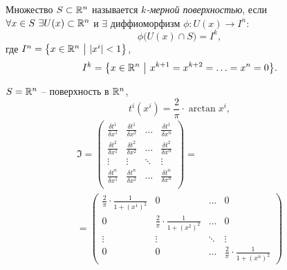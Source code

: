 

\begin{definition}
    Множество $ S \subset \mathbb{R}^n $ называется \emph{$ k $-мерной поверхностью}, если $ \forall x \in S \ \exists U(x)\subset\R^n $ и $ \exists $ диффиоморфизм $ \phi: U(x)\rightarrow I^n $:
    \[
        \phi\big(U(x)\cap S\big) = I^k,
    \] где $ I^n = \big\{x \in \mathbb{R}^n \ \big| \ |x^i| < 1 \big\} $,
    \[
        I^k = \big\{x \in \mathbb{R}^n \ \big| \ x^{k+1} = x^{k+2} = \ldots = x^n = 0\big\}.
    \]
\end{definition}

\begin{example}
    $S = \mathbb{R}^n$ -- поверхность в $\mathbb{R}^n$,
    \[
        t^i(x^i) = \frac{2}{\pi}\cdot \arctan x^i,
    \]
    \begin{multline*}
        \mathfrak{I} = \left(\begin{matrix}
                \frac{\delta t^1}{\delta x^1} & \frac{\delta t^1}{\delta x^2} & \ldots & \frac{\delta t^1}{\delta x^n} \\
                \frac{\delta t^2}{\delta x^1} & \frac{\delta t^2}{\delta x^2} & \ldots & \frac{\delta t^2}{\delta x^n} \\
                \vdots                        & \vdots                        & \ddots & \vdots                        \\
                \frac{\delta t^n}{\delta x^1} & \frac{\delta t^n}{\delta x^2} & \ldots & \frac{\delta t^n}{\delta x^n} \\
            \end{matrix}\right) = \\
        = \left(\begin{matrix}
                \frac{2}{\pi} \cdot \frac{1}{1 + (x^1)^2} & 0                                         & \ldots & 0                                         \\
                0                                         & \frac{2}{\pi} \cdot \frac{1}{1 + (x^2)^2} & \ldots & 0                                         \\
                \vdots                                    & \vdots                                    & \ddots & \vdots                                    \\
                0                                         & 0                                         & \ldots & \frac{2}{\pi} \cdot \frac{1}{1 + (x^n)^2}
            \end{matrix}\right)
    \end{multline*}
\end{example}


